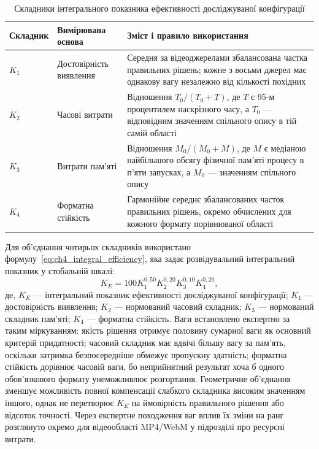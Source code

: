\begin{table}[htbp]
\caption{Складники інтегрального показника ефективності досліджуваної конфігурації}
\label{tab:ch4_integral_components}
\centering
\small
\begin{tabularx}{\textwidth}{p{}p{}Y}
\toprule
Складник & Вимірювана основа & Зміст і правило використання \\
\midrule
$K_1$ & Достовірність виявлення & Середня за відеоджерелами збалансована частка правильних рішень; кожне з восьми джерел має однакову вагу незалежно від кількості похідних \\
$K_2$ & Часові витрати & Відношення $T_0/(T_0+T)$, де $T$ є 95-м процентилем наскрізного часу, а $T_0$ --- відповідним значенням спільного опису в тій самій області \\
$K_3$ & Витрати пам’яті & Відношення $M_0/(M_0+M)$, де $M$ є медіаною найбільшого обсягу фізичної пам’яті процесу в п’яти запусках, а $M_0$ --- значенням спільного опису \\
$K_4$ & Форматна стійкість & Гармонійне середнє збалансованих часток правильних рішень, окремо обчислених для кожного формату порівнюваної області \\
\bottomrule
\end{tabularx}
\end{table}

Для об’єднання чотирьох складників використано формулу~\eqref{eq:ch4_integral_efficiency}, яка задає розвідувальний інтегральний показник у стобальній шкалі:
\begin{equation}
K_E=100K_1^{0{,}50}K_2^{0{,}20}K_3^{0{,}10}K_4^{0{,}20},
\label{eq:ch4_integral_efficiency}
\end{equation}
де, $K_E$ --- інтегральний показник ефективності досліджуваної конфігурації; $K_1$ --- достовірність виявлення; $K_2$ --- нормований часовий складник; $K_3$ --- нормований складник пам’яті; $K_4$ --- форматна стійкість. Ваги встановлено експертно за таким міркуванням: якість рішення отримує половину сумарної ваги як основний критерій придатності; часовий складник має вдвічі більшу вагу за пам’ять, оскільки затримка безпосередніше обмежує пропускну здатність; форматна стійкість дорівнює часовій ваги, бо неприйнятний результат хоча б одного обов’язкового формату унеможливлює розгортання. Геометричне об’єднання зменшує можливість повної компенсації слабкого складника високим значенням іншого, однак не перетворює $K_E$ на ймовірність правильного рішення або відсоток точності. Через експертне походження ваг вплив їх зміни на ранг розглянуто окремо для відеообласті MP4/WebM у підрозділі про ресурсні витрати.


